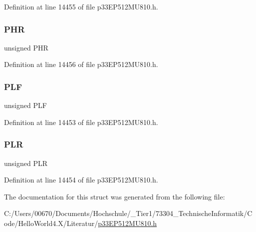 Definition at line 14455 of file p33\+E\+P512\+M\+U810.\+h.

\mbox{\label{structtag_l_e_b_c_o_n2_b_i_t_s_ae02a9c6926c3a1feac21cec18a520e4a}} 
\subsubsection{\texorpdfstring{P\+HR}{PHR}}
{\footnotesize\ttfamily unsigned P\+HR}



Definition at line 14456 of file p33\+E\+P512\+M\+U810.\+h.

\mbox{\label{structtag_l_e_b_c_o_n2_b_i_t_s_ab72be8b35e01107182afb8e9733d72bb}} 
\subsubsection{\texorpdfstring{P\+LF}{PLF}}
{\footnotesize\ttfamily unsigned P\+LF}



Definition at line 14453 of file p33\+E\+P512\+M\+U810.\+h.

\mbox{\label{structtag_l_e_b_c_o_n2_b_i_t_s_a5f690459b53fc81b46dbbac226cecb25}} 
\subsubsection{\texorpdfstring{P\+LR}{PLR}}
{\footnotesize\ttfamily unsigned P\+LR}



Definition at line 14454 of file p33\+E\+P512\+M\+U810.\+h.



The documentation for this struct was generated from the following file\+:\begin{DoxyCompactItemize}
\item 
C\+:/\+Users/00670/\+Documents/\+Hochschule/\+\_\+\+Tier1/73304\+\_\+\+Technische\+Informatik/\+Code/\+Hello\+World4.\+X/\+Literatur/\hyperlink{p33_e_p512_m_u810_8h}{p33\+E\+P512\+M\+U810.\+h}\end{DoxyCompactItemize}
